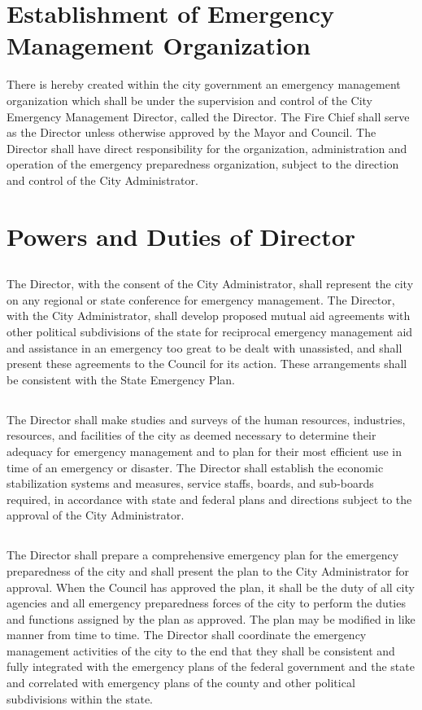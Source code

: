 \section{Establishment of Emergency Management Organization}
There is hereby created within the city government an emergency management organization which shall be under the supervision and control of the City Emergency Management Director, called the Director. The Fire Chief shall serve as the Director unless otherwise approved by the Mayor and Council. The Director shall have direct responsibility for the organization, administration and operation of the emergency preparedness organization, subject to the direction and control of the City Administrator.

\section{Powers and Duties of Director}
\subsection{}
The Director, with the consent of the City Administrator, shall represent the city on any regional or state conference for emergency management. The Director, with the City Administrator, shall develop proposed mutual aid agreements with other political subdivisions of the state for reciprocal emergency management aid and assistance in an emergency too great to be dealt with unassisted, and shall present these agreements to the Council for its action.  These arrangements shall be consistent with the State Emergency Plan.
\subsection{}
The Director shall make studies and surveys of the human resources, industries, resources, and facilities of the city as deemed necessary to determine their adequacy for emergency management and to plan for their most efficient use in time of an emergency or disaster. The Director shall establish the economic stabilization systems and measures, service staffs, boards, and sub-boards required, in accordance with state and federal plans and directions subject to the approval of the City Administrator.
\subsection{}
The Director shall prepare a comprehensive emergency plan for the emergency preparedness of the city and shall present the plan to the City Administrator for approval.   When the Council has approved the plan, it shall be the duty of all city agencies and all emergency preparedness forces of the city to perform the duties and functions assigned by the plan as approved. The plan may be modified in like manner from time to time. The Director shall coordinate the emergency management activities of the city to the end that they shall be consistent and fully integrated with the emergency plans of the federal government and the state and correlated with emergency plans of the county and other political subdivisions within the state.
